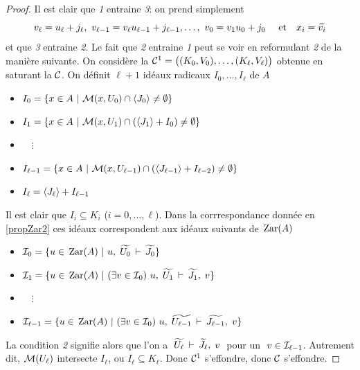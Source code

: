 \begin{proof}
Il est clair que \emph{1} entraine \emph{3}: on prend simplement
$$v_\ell = u_\ell+j_\ell,~v_{\ell-1} = v_\ell u_{\ell-1} +
j_{\ell-1},\dots,~v_0 = v_1u_0 + j_0
~~~~{\rm  et}~~~ x_i= \widetilde{v_i}
$$
et que \emph{3} entraine \emph{2}.
Le fait que \emph{2} entraine \emph{1} peut se voir en reformulant
\emph{2} de la manière suivante.
On considère la \proc ${\cal C}^1=\big((K_0,V_0),\ldots,(K_\ell,V_\ell)\big)$ obtenue
en saturant la \proc ${\cal C}$.
On définit  $\ell+1$ idéaux radicaux
$I_0,\dots,I_{\ell}$ de $A$
\begin{itemize}
\item $I_0 = \{x\in A~|~{\cal M}(x,U_0)\cap \left\langle{J_0}\right\rangle \neq \emptyset \}$
\item $I_1 = \{x\in A~|~{\cal M}(x,U_1)\cap (\left\langle{J_1}\right\rangle + I_0) \neq \emptyset\}$
\item ~~$\vdots$
\item $I_{\ell-1} = \{x\in A~|~{\cal M}(x,U_{\ell-1})\cap (\left\langle{J_{\ell-1}}\right\rangle +
I_{\ell-2}) \neq \emptyset \}$
\item $I_\ell=\left\langle{J_\ell}\right\rangle+I_{\ell-1}$
\end{itemize}
Il est clair que $I_i\subseteq K_i$ ($i=0,\ldots,\ell$).
Dans la corrrespondance donnée en \ref{propZar2} ces idéaux
correspondent aux idéaux suivants de $\,{\rm Zar}(A)$
  \begin{itemize}
\item ${{\cal I}}_0 =
  \{u\in \,{\rm Zar}(A)~|~ u,\;  \widetilde{U_0} \,\vdash\,  \widetilde{J_0}\}$
\item ${{\cal I}}_1 =
  \{u\in \,{\rm Zar}(A)~|~ (\exists v\in {{\cal I}}_0)~
                    u,\;  \widetilde{U_1} \,\vdash\, \widetilde{J_1},\;
v\}$
\item ~~$\vdots$
\item ${{\cal I}}_{\ell-1} =
  \{u\in \,{\rm Zar}(A)~|~ (\exists v\in {{\cal I}}_0)~
                     u,\;  \widetilde{U_{\ell-1}} \,\vdash\,
\widetilde{J_{\ell-1}},\; v\}$
\end{itemize}
La condition  \emph{2}  signifie alors que l'on a
$\;\widetilde{U_{\ell}}\,\vdash\,  \widetilde{J_{\ell}},\; v\;$ pour un
$\;v\in {{\cal I}}_{\ell-1}$.
Autrement dit, ${\cal M}(U_{\ell})$ intersecte
$I_{\ell}$, ou $I_{\ell}\subseteq K_{\ell}$. 
Donc ${\cal C}^1$ s'effondre, donc ${\cal C}$ s'effondre.



\end{proof}
